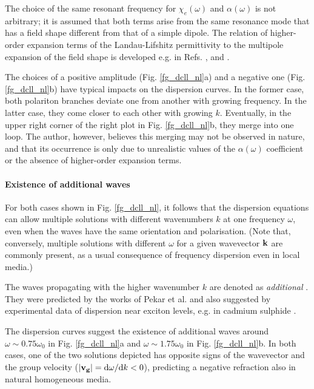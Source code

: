 \label{chap_sd}
The choice of the same resonant frequency for $\chi_e(\omega)$ and $\alpha(\omega)$ is not arbitrary; it is assumed that both terms arise from the same resonance mode that has a field shape different from that of a simple dipole.  The relation of higher-order expansion terms of the Landau-Lifshitz permittivity  to the multipole expansion of the field shape is developed e.g. in Refs. \cite{agranovich2006spatial}, \cite{vinogradov2002form} and \cite{fietz2011homogenization}.

The choices of a positive amplitude (Fig. \ref{fg_dcll_nl}a) and a negative one (Fig. \ref{fg_dcll_nl}b) have typical impacts on the dispersion curves. In the former case, both polariton branches deviate one from another with growing frequency. In the latter case, they come closer to each other with growing $k$. Eventually, in the upper right corner of the right plot in Fig. \ref{fg_dcll_nl}b, they merge into one loop. The author, however, believes this merging may not be observed in nature, and that its occurrence is only due to unrealistic values of the $\alpha(\omega)$ coefficient or the absence of higher-order expansion terms.

\paragraph{Existence of additional waves}   %
For both cases shown in Fig. \ref{fg_dcll_nl}, it follows that the dispersion equations can allow multiple solutions with different wavenumbers $k$ at one frequency $\omega$, even when the waves have the same orientation and polarisation. (Note that, conversely, multiple solutions with different $\omega$ for a given wavevector ${\mathbf{k}}$ are commonly present, as a usual consequence of frequency dispersion even in local media.)

The waves propagating with the higher wavenumber $k$ are denoted as \textit{additional} \cite{agranovich2006spatial, agranovich2004linear, krowne2007book, agranovich1962crystal}. They were predicted by the works of Pekar et al. and also suggested by experimental data of dispersion near exciton levels, e.g. in cadmium sulphide \cite{pekar1975spatial}. 

The dispersion curves suggest the existence of additional waves around $\omega \sim 0.75 \omega_0$ in  Fig. \ref{fg_dcll_nl}a and $\omega \sim 1.75 \omega_0$ in  Fig. \ref{fg_dcll_nl}b. In both cases, one of the two solutions depicted has opposite signs of the wavevector and the group velocity ($|{\mathbf{v_g}}| = \mathrm{d}\omega/\mathrm{d}k < 0$), predicting a negative refraction also in natural homogeneous media.

